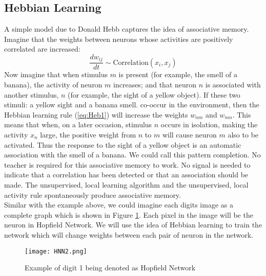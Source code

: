 \subsection{Hebbian Learning}
A simple model due to Donald Hebb captures the idea of associative memory. Imagine that the weights between neurons whose activities are positively correlated are increased:
\begin{equation}
	\label{eq:Heb1}
	\frac{dw_{ij}}{dt} \sim \text{Correlation}(x_i, x_j)
  \end{equation}
  Now imagine that when stimulus $m$ is present (for example, the smell of a banana), the activity of neuron $m$ increases; and that neuron $n$ is associated with another stimulus, $n$ (for example, the sight of a yellow object). If these two stimuli: a yellow sight and a banana smell. co-occur in the environment, then the Hebbian learning rule (\ref{eq:Heb1}) will increase the weights $w_{nm}$ and $w_{mn}$. This means that when, on a later occasion, stimulus $n$ occurs in isolation, making the activity $x_n$ large, the positive weight from $n$ to $m$ will cause neuron $m$ also to be activated. Thus the response to the sight of a yellow object is an automatic association with the smell of a banana. We could call this pattern completion. No teacher is required for this associative memory to work. No signal is needed to indicate that a correlation has been detected or that an association should be made. The unsupervised, local learning algorithm and the unsupervised, local activity rule spontaneously produce associative memory.\\

  Similar with the example above, we could imagine each digits image as a complete graph which is shown in Figure \ref{fg:HNN2}. Each pixel in the image will be the neuron in Hopfield Network. We will use the idea of Hebbian learning to train the network which will change weights between each pair of neuron in the network.\\
  \begin{figure}[h]
  \centering
  \texttt{[image: HNN2.png]}
  \caption{Example of digit 1 being denoted as Hopfield Network}
  \label{fg:HNN2}
  \end{figure}

